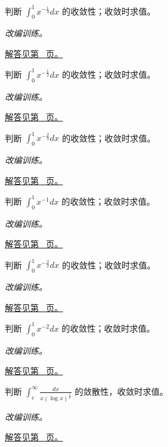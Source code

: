 \documentclass[UTF8,12pt,a4paper,fontset=fandol]{ctexart}
\begin{document}
\begin{example}[有限端点的幂奇异性]\label{ex:c19q8}
判断 $\displaystyle\int_0^1x^{-\frac{1}{3}}dx$ 的收敛性；收敛时求值。
\par\textit{改编训练。}\par\hyperref[ans:c19q8]{解答见第~\pageref{ans:c19q8} 页。}
\end{example}
\begin{example}[有限端点的幂奇异性]\label{ex:c19q9}
判断 $\displaystyle\int_0^1x^{-\frac{1}{2}}dx$ 的收敛性；收敛时求值。
\par\textit{改编训练。}\par\hyperref[ans:c19q9]{解答见第~\pageref{ans:c19q9} 页。}
\end{example}
\begin{example}[有限端点的幂奇异性]\label{ex:c19q10}
判断 $\displaystyle\int_0^1x^{-\frac{2}{3}}dx$ 的收敛性；收敛时求值。
\par\textit{改编训练。}\par\hyperref[ans:c19q10]{解答见第~\pageref{ans:c19q10} 页。}
\end{example}
\begin{example}[有限端点的幂奇异性]\label{ex:c19q11}
判断 $\displaystyle\int_0^1x^{-1}dx$ 的收敛性；收敛时求值。
\par\textit{改编训练。}\par\hyperref[ans:c19q11]{解答见第~\pageref{ans:c19q11} 页。}
\end{example}
\begin{example}[有限端点的幂奇异性]\label{ex:c19q12}
判断 $\displaystyle\int_0^1x^{-\frac{3}{2}}dx$ 的收敛性；收敛时求值。
\par\textit{改编训练。}\par\hyperref[ans:c19q12]{解答见第~\pageref{ans:c19q12} 页。}
\end{example}
\begin{example}[有限端点的幂奇异性]\label{ex:c19q13}
判断 $\displaystyle\int_0^1x^{-2}dx$ 的收敛性；收敛时求值。
\par\textit{改编训练。}\par\hyperref[ans:c19q13]{解答见第~\pageref{ans:c19q13} 页。}
\end{example}
\begin{example}[对数修正的临界情形]\label{ex:c19q14}
判断 $\displaystyle\int_e^\infty\frac{dx}{x(\log x)^{\frac{1}{2}}}$ 的敛散性，收敛时求值。
\par\textit{改编训练。}\par\hyperref[ans:c19q14]{解答见第~\pageref{ans:c19q14} 页。}
\end{example}
\end{document}
